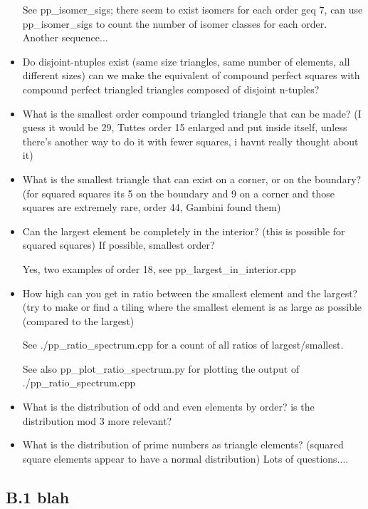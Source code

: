 \documentclass[12pt,amstags,fleqn]{article}
\theoremstyle{plain}
\theoremstyle{definition}
\begin{document}
\begin{itemize}
See pp\_isomer\_sigs; there seem to exist isomers for each order geq
7, can use pp\_isomer\_sigs to count the number of isomer classes
for each order. Another sequence...

\item Do disjoint-ntuples exist (same size triangles, same number of
elements, all different sizes) can we make the equivalent of compound
perfect squares with compound perfect triangled triangles composed
of disjoint n-tuples?

\item What is the smallest order compound triangled triangle that can
be made? (I guess it would be 29, Tuttes order 15 enlarged and put
inside itself, unless there's another way to do it with fewer squares,
i havnt really thought about it)

\item What is the smallest triangle that can exist on a corner, or
on the boundary? (for squared squares its 5 on the boundary and 9
on a corner and those squares are extremely rare, order 44, Gambini
found them)

\item Can the largest element be completely in the interior? (this
is possible for squared squares) If possible, smallest order?

Yes, two examples of order 18, see pp\_largest\_in\_interior.cpp

\item How high can you get in ratio between the smallest element and
the largest? (try to make or find a tiling where the smallest element
is as large as possible (compared to the largest)

See ./pp\_ratio\_spectrum.cpp for a count of all ratios of largest/smallest.

See also pp\_plot\_ratio\_spectrum.py for plotting the output of ./pp\_ratio\_spectrum.cpp 

\item What is the distribution of odd and even elements by order?
is the distribution mod 3 more relevant?

\item What is the distribution of prime numbers as triangle elements?
(squared square elements appear to have a normal distribution) Lots
of questions....

\end{itemize}

\clearpage
\subsection*{B.1 blah}
\end{document}
